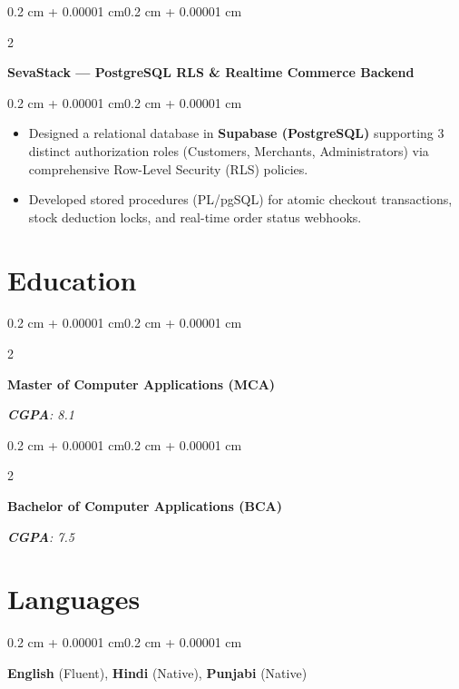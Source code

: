 \documentclass[10pt, a4paper]{article}
\newenvironment{highlights}{
    \begin{itemize}[
        topsep=0.06 cm,
        parsep=0.05 cm,
        partopsep=0pt,
        itemsep=0pt,
        leftmargin=0.4 cm + 10pt
    ]
}{
    \end{itemize}
}
\newenvironment{onecolentry}{
    \begin{adjustwidth}{0.2 cm + 0.00001 cm}{0.2 cm + 0.00001 cm}
}{
    \end{adjustwidth}
}
\newenvironment{twocolentry}[2][]{
    \onecolentry
    \def\secondColumn{#2}
    \setcolumnwidth{\fill, 4.5 cm}
    \begin{paracol}{2}
}{
    \switchcolumn \raggedleft \secondColumn
    \end{paracol}
    \endonecolentry
}
\let\hrefWithoutArrow\href
\renewcommand{\href}[2]{\hrefWithoutArrow{#1}{\ifthenelse{\equal{#2}{}}{ }{#2 }\raisebox{.15ex}{\footnotesize \faExternalLink*}}}
\begin{document}
\begin{twocolentry}{\textit{\href{https://github.com/I-am-Manu-Singh/SevaStack-App}{\underline{Repo}}}}
    \textbf{SevaStack — PostgreSQL RLS \& Realtime Commerce Backend}
\end{twocolentry}
\vspace{0.06 cm}
\begin{onecolentry}
    \begin{highlights}
    \item Designed a relational database in \textbf{Supabase (PostgreSQL)} supporting 3 distinct authorization roles (Customers, Merchants, Administrators) via comprehensive Row-Level Security (RLS) policies.
    \item Developed stored procedures (PL/pgSQL) for atomic checkout transactions, stock deduction locks, and real-time order status webhooks.
    \end{highlights}
\end{onecolentry}

\section{Education}
\begin{twocolentry}{\textit{\textbf{CGPA}: 8.1}}
    \textbf{Master of Computer Applications (MCA)} 
\end{twocolentry}
\vspace{0.04 cm}
\begin{twocolentry}{\textit{\textbf{CGPA}: 7.5}}
    \textbf{Bachelor of Computer Applications (BCA)} 
\end{twocolentry}

\section{Languages}
\begin{onecolentry}
\textbf{English} (Fluent), \textbf{Hindi} (Native), \textbf{Punjabi} (Native)
\end{onecolentry}
\end{document}
